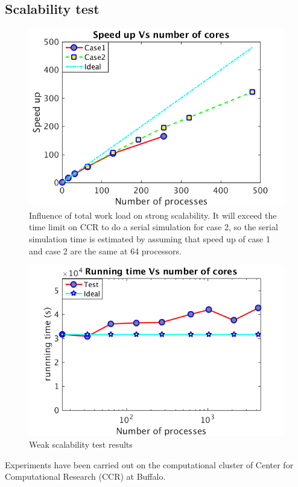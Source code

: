 \documentclass[conference,compsoc]{IEEEtran}
\begin{document}
\subsection{Scalability test}
\begin{figure}[!t]
\centering
\includegraphics[scale=0.33]{strong_scale}
\caption{Influence of total work load on strong scalability. It will exceed the time limit on CCR to do a serial simulation for case 2, so the serial simulation time is estimated by assuming that speed up of case 1 and case 2 are the same at 64 processors.}
\label{fig:2cases_efficiency}
\end{figure}
%
\begin{figure}[!t]
\centering
\includegraphics[scale=0.35]{weak_scale}
\caption{Weak scalability test results}
\label{fig:weak_loglog}
\end{figure}
Experiments have been carried out on the computational cluster of Center for Computational Research (CCR) at Buffalo. 
\end{document}
